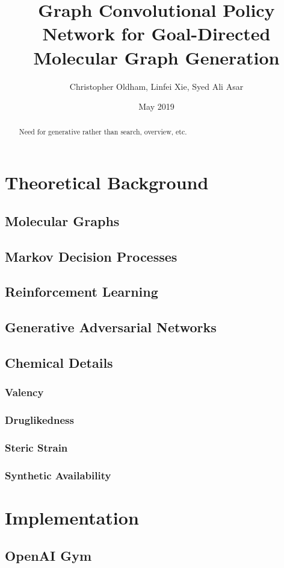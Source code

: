\documentclass{article}
\title{Graph Convolutional Policy Network for Goal-Directed Molecular Graph Generation}
\author{Christopher Oldham, Linfei Xie, Syed Ali Asar }
\date{May 2019}
\begin{document}
\maketitle

\begin{abstract}
    Need for generative rather than search, overview, etc.
\end{abstract}

\section{Theoretical Background}
\subsection{Molecular Graphs}
\subsection{Markov Decision Processes}
\subsection{Reinforcement Learning}
\subsection{Generative Adversarial Networks}
\subsection{Chemical Details}
\subsubsection*{Valency}
\subsubsection*{Druglikedness}
\subsubsection*{Steric Strain}
\subsubsection*{Synthetic Availability}
\section{Implementation}
\subsection{OpenAI Gym}
\end{document}
